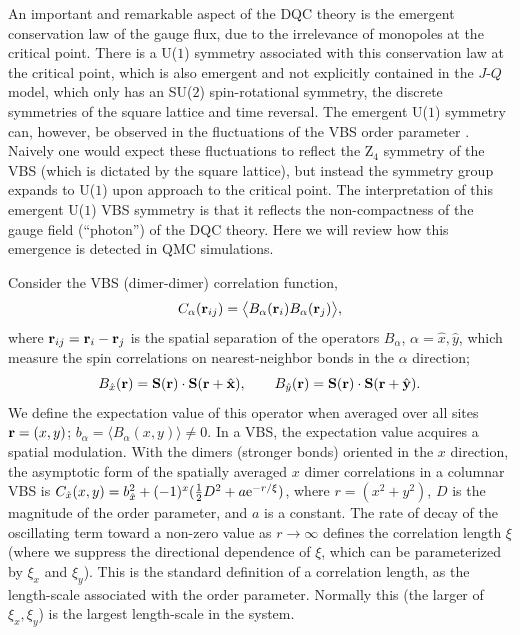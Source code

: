 \documentclass[10pt,pre,aps,twocolumn,showpacs,subscriptaddresses,floatfix]{revtex4}
\begin{document}
An important and remarkable aspect of the DQC theory is the emergent conservation law of the gauge flux, due to the irrelevance of monopoles at the critical point. 
There is a U($1$) symmetry associated with this conservation law at the critical point, which is also emergent and not explicitly contained in 
the $J$-$Q$ model, which only has an SU($2$) spin-rotational symmetry, the discrete symmetries of the square lattice and time reversal. The emergent U($1$) 
symmetry can, however, be observed in the fluctuations of the VBS order parameter \cite{Sandvik07}. Naively one would expect these fluctuations 
to reflect the Z$_4$ symmetry of the VBS (which is dictated by the square lattice), but instead the symmetry group expands to U($1$) upon approach to the 
critical point. The interpretation of this emergent U($1$) VBS symmetry is that it reflects the non-compactness of the gauge field (``photon'') 
of the DQC theory. Here we will review how this emergence is detected in QMC simulations.

Consider the VBS (dimer-dimer) correlation function,
\begin{equation}
C_{\alpha} ({\bf r}_{ij}) = \bigl \langle B_\alpha({\bf r}_i)B_\alpha({\bf r}_j) \bigr \rangle, 
\label{cddef}
\end{equation}
where ${\bf r}_{ij}={\bf r}_{i}-{\bf r}_{j}$ is the spatial separation of the operators $B_\alpha$, $\alpha=\hat x,\hat y$,
which measure the spin correlations on nearest-neighbor bonds in the $\alpha$ direction;
\begin{equation}
B_{\hat x}({\bf r})={\bf S}({\bf r}) \cdot {\bf S}({\bf r}+\hat {\bf x}),~~~~~~B_{\hat y}({\bf r})={\bf S}({\bf r}) \cdot {\bf S}({\bf r}+\hat {\bf y}).
\label{bxdef}
\end{equation}
We define the expectation value of this operator when averaged over all sites ${\bf r}=(x,y)$; $b_\alpha=\langle B_{\alpha}(x,y)\rangle \not = 0$. In a VBS, the 
expectation value acquires a spatial modulation. With the dimers (stronger bonds) oriented in the $x$ direction, the asymptotic form of the spatially averaged 
$x$ dimer correlations in a columnar VBS is $C_{\hat x}(x,y) = b_{\hat x}^2+(-1)^{x}(\hbox{$\frac{1}{2}$}D^2+a{\rm e}^{-r/\xi})$, where $r=(x^2+y^2)$, $D$ is the 
magnitude of the order parameter, and $a$ is a constant. The rate of decay of the oscillating term toward a non-zero value as $r\to \infty$ defines the correlation 
length $\xi$ (where we suppress the directional dependence of $\xi$, which can be parameterized by $\xi_x$ and $\xi_y$). This is the standard definition of a 
correlation length, as the length-scale associated with the order parameter. Normally this (the larger of $\xi_x,\xi_y$) is the largest length-scale in the system. 
\end{document}
